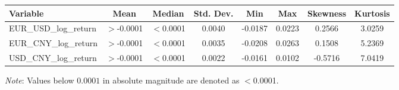 \begin{tabular}{lccccccc}
  \toprule
  \textbf{Variable} & \textbf{Mean} & \textbf{Median} & \textbf{Std. Dev.} & \textbf{Min} & \textbf{Max} & \textbf{Skewness} & \textbf{Kurtosis} \\ 
  \midrule
  EUR\_USD\_log\_return & $>$-0.0001 & $<$0.0001 & 0.0040 & -0.0187 & 0.0223 & 0.2566 & 3.0259 \\ 
  EUR\_CNY\_log\_return & $>$-0.0001 & $<$0.0001 & 0.0035 & -0.0208 & 0.0263 & 0.1508 & 5.2369 \\ 
  USD\_CNY\_log\_return & $>$-0.0001 & $<$0.0001 & 0.0022 & -0.0161 & 0.0102 & -0.5716 & 7.0419 \\ 
  \bottomrule
\end{tabular}
\par\vspace{4pt}
\begin{minipage}{\linewidth}
  \footnotesize \textit{Note}: Values below $0.0001$ in absolute magnitude are denoted as $<$0.0001.
\end{minipage}